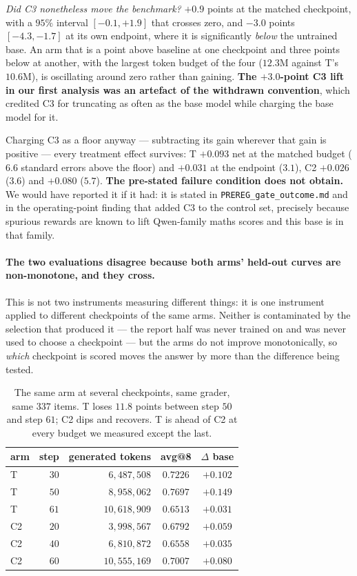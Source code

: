 \emph{Did C3 nonetheless move the benchmark?} $+0.9$ points at the matched checkpoint, with a
$95\%$ interval $[-0.1,+1.9]$ that crosses zero, and $-3.0$ points $[-4.3,-1.7]$ at its own
endpoint, where it is significantly \emph{below} the untrained base. An arm that is a point
above baseline at one checkpoint and three points below at another, with the largest token
budget of the four ($12.3$M against T's $10.6$M), is oscillating around zero rather than
gaining. \textbf{The $+3.0$-point C3 lift in our first analysis was an artefact of the
withdrawn convention}, which credited C3 for truncating as often as the base model while
charging the base model for it.

Charging C3 as a floor anyway --- subtracting its gain wherever that gain is positive --- every
treatment effect survives: T $+0.093$ net at the matched budget ($6.6$ standard errors above
the floor) and $+0.031$ at the endpoint ($3.1$), C2 $+0.026$ ($3.6$) and $+0.080$ ($5.7$).
\textbf{The pre-stated failure condition does not obtain.} We would have reported it if it had:
it is stated in \texttt{PREREG\_gate\_outcome.md} and in the operating-point finding that added
C3 to the control set, precisely because spurious rewards are known to lift Qwen-family maths
scores and this base is in that family.

\paragraph{The two evaluations disagree because both arms' held-out curves are non-monotone,
and they cross.} This is not two instruments measuring different things: it is one instrument
applied to different checkpoints of the same arms. Neither is contaminated by the selection
that produced it --- the report half was never trained on and was never used to choose a
checkpoint --- but the arms do not improve monotonically, so \emph{which} checkpoint is
scored moves the answer by more than the difference being tested.

\begin{table}[t]
\centering\small
\caption{The same arm at several checkpoints, same grader, same $337$ items. T loses $11.8$
points between step $50$ and step $61$; C2 dips and recovers. T is ahead of C2 at every budget
we measured except the last.}
\label{tab:b200traj}
\begin{tabular}{lrrcc}
\toprule
arm & step & generated tokens & avg@8 & $\Delta$ base \\
\midrule
T  & $30$ & $6{,}487{,}508$  & $0.7226$ & $+0.102$ \\
T  & $50$ & $8{,}958{,}062$  & $\mathbf{0.7697}$ & $\mathbf{+0.149}$ \\
T  & $61$ & $10{,}618{,}909$ & $0.6513$ & $+0.031$ \\
\addlinespace
C2 & $20$ & $3{,}998{,}567$  & $0.6792$ & $+0.059$ \\
C2 & $40$ & $6{,}810{,}872$  & $0.6558$ & $+0.035$ \\
C2 & $60$ & $10{,}555{,}169$ & $0.7007$ & $+0.080$ \\
\bottomrule
\end{tabular}
\end{table}

